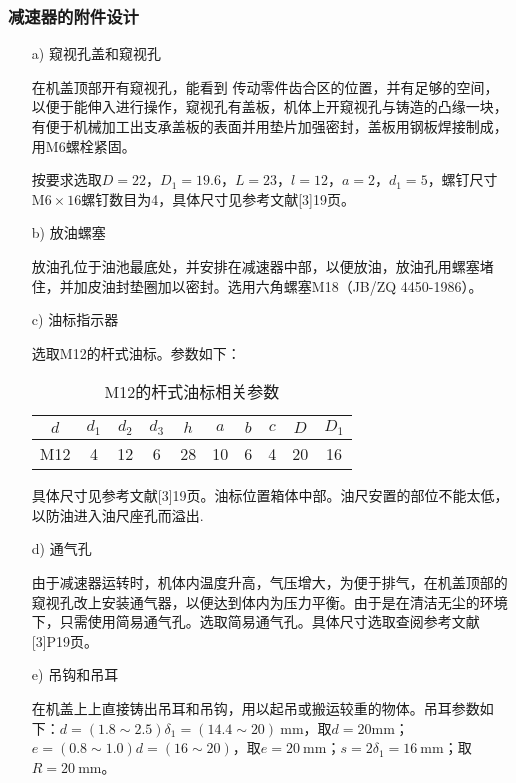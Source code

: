\subsubsection{减速器的附件设计}
\begin{itemize}
	\item [a)]窥视孔盖和窥视孔
	\par 在机盖顶部开有窥视孔，能看到 传动零件齿合区的位置，并有足够的空间，以便于能伸入进行操作，窥视孔有盖板，机体上开窥视孔与铸造的凸缘一块，有便于机械加工出支承盖板的表面并用垫片加强密封，盖板用钢板焊接制成，用M6螺栓紧固。
	\par 按要求选取$D=22$，$D_1=19.6$，$L=23$，$l=12$，$a=2$，$d_1=5$，螺钉尺寸$\mathrm{M}6\times 16$螺钉数目为4，具体尺寸见参考文献[3]19页。
	\item[b)]放油螺塞
	\par 放油孔位于油池最底处，并安排在减速器中部，以便放油，放油孔用螺塞堵住，并加皮油封垫圈加以密封。选用六角螺塞M18（JB/ZQ 4450-1986）。
	\item[c)]油标指示器
	\par 选取M12的杆式油标。参数如下：
	\begin{table}[H]
		\begin{center}
			\caption{M12的杆式油标相关参数}
			\begin{tabular}{cccccccccc}
				\toprule
				$d$& $d_1$ & $d_2$ & $d_3$ & $h$ & $a$ & $b$ & $c$ & $D$ & $D_1$ \\
				\midrule
				M12&	4 &	12 &	6 &	28 &	10 &	6 & 4 &20& 16 \\
				\bottomrule
			\end{tabular}
		\end{center}
	\end{table}
	\par 具体尺寸见参考文献[3]19页。油标位置箱体中部。油尺安置的部位不能太低，以防油进入油尺座孔而溢出.
	\item[d)] 通气孔
	\par 由于减速器运转时，机体内温度升高，气压增大，为便于排气，在机盖顶部的窥视孔改上安装通气器，以便达到体内为压力平衡。由于是在清洁无尘的环境下，只需使用简易通气孔。选取简易通气孔。具体尺寸选取查阅参考文献[3]P19页。
	\item[e)] 吊钩和吊耳
	\par 在机盖上上直接铸出吊耳和吊钩，用以起吊或搬运较重的物体。吊耳参数如下：$d=\left(1.8\sim 2.5\right)\delta_1=(14.4\sim 20)~\mathrm{mm}$，取$d=20\mathrm{mm}$；$e=\left(0.8\sim 1.0\right)d=\left(16\sim 20\right)$，取$e=20~\mathrm{mm}$；$s=2\delta_1=16~\mathrm{mm}$；取$R=20~\mathrm{mm}$。

\end{itemize}
